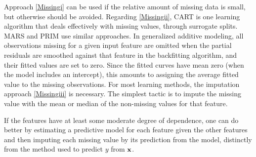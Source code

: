 Approach \autoref{Missingi} can be used if the relative amount of missing data is small, but otherwise should be avoided. Regarding \autoref{Missingii}, CART is one learning algorithm that deals effectively with missing values, through surrogate splits. MARS and PRIM use similar approaches. In generalized additive modeling, all observations missing for a given input feature are omitted when the partial residuals are smoothed against that feature in the backfitting algorithm, and their fitted values are set to zero. Since the fitted curves have mean zero (when the model includes an intercept), this amounts to assigning the average fitted value to the missing observations.
For most learning methods, the imputation approach \autoref{Missingiii} is necessary. The simplest tactic is to impute the missing value with the mean or median of the non-missing values for that feature.

If the features have at least some moderate degree of dependence, one can do better by estimating a predictive model for each feature given the other features and then imputing each missing value by its prediction from the model, distinctly from the method used to predict $y$ from $\mathbf{x}$.